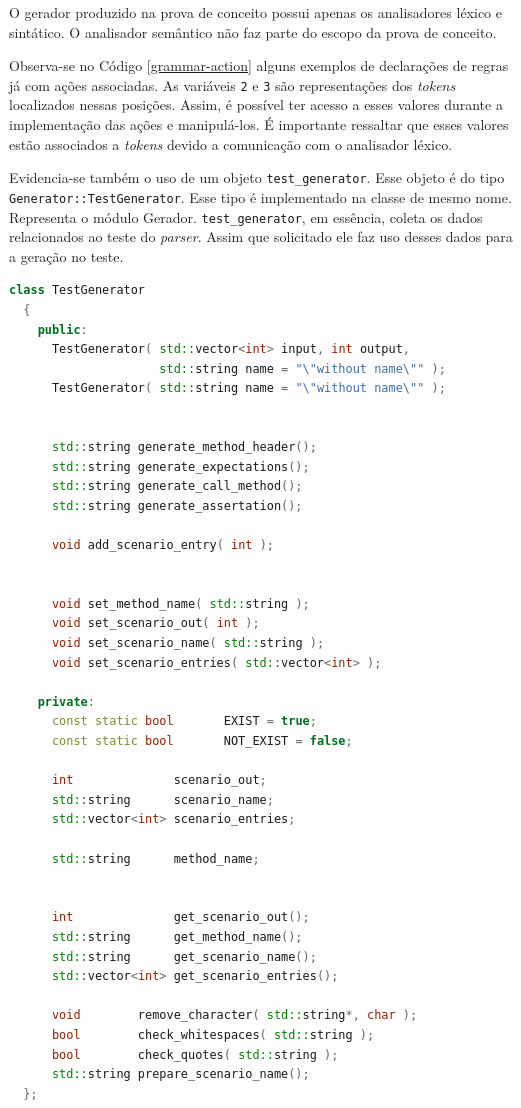 \par
\indent O gerador produzido na prova de conceito possui apenas os analisadores léxico e sintático. O analisador semântico não faz parte do escopo da prova de conceito.
\par
\indent Observa-se no Código \ref{grammar-action} alguns exemplos de declarações de regras já com ações associadas. As variáveis \textdollar\lstinline|2| e \textdollar\lstinline|3| são representações dos \textit{tokens} localizados nessas posições. Assim, é possível ter acesso a esses valores durante a implementação das ações e manipulá-los. É importante ressaltar que esses valores estão associados a \textit{tokens} devido a comunicação com o analisador léxico.
\par
\indent Evidencia-se também o uso de um objeto \lstinline|test_generator|. Esse objeto é do tipo \lstinline|Generator::TestGenerator|. Esse tipo é implementado na classe de mesmo nome. Representa o módulo Gerador. \lstinline|test_generator|, em essência, coleta os dados relacionados ao teste do \textit{parser}. Assim que solicitado ele faz uso desses dados para a geração no teste.
\begin{lstlisting}[language=C++, label=testgeneratorhpp, caption=Interface (\textit{header}) da classe TestGenerator]
  class TestGenerator
  {
    public:
      TestGenerator( std::vector<int> input, int output,
                     std::string name = "\"without name\"" );
      TestGenerator( std::string name = "\"without name\"" );


      std::string generate_method_header();
      std::string generate_expectations();
      std::string generate_call_method();
      std::string generate_assertation();

      void add_scenario_entry( int );


      void set_method_name( std::string );
      void set_scenario_out( int );
      void set_scenario_name( std::string );
      void set_scenario_entries( std::vector<int> );

    private:
      const static bool       EXIST = true;
      const static bool       NOT_EXIST = false;

      int              scenario_out;
      std::string      scenario_name;
      std::vector<int> scenario_entries;

      std::string      method_name;


      int              get_scenario_out();
      std::string      get_method_name();
      std::string      get_scenario_name();
      std::vector<int> get_scenario_entries();

      void        remove_character( std::string*, char );
      bool        check_whitespaces( std::string );
      bool        check_quotes( std::string );
      std::string prepare_scenario_name();
  };
\end{lstlisting}
